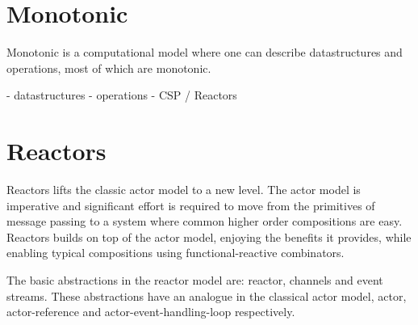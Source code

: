 \section{Monotonic}

Monotonic is a computational model where one can describe datastructures and operations, most of which are monotonic.

- datastructures
- operations
- CSP / Reactors


\section{Reactors}

Reactors lifts the classic actor model to a new level. The actor model is imperative and significant effort is required to move from the primitives of message passing to a system where common higher order compositions are easy. Reactors builds on top of the actor model, enjoying the benefits it provides, while enabling typical compositions using functional-reactive combinators.

The basic abstractions in the reactor model are: reactor, channels and event streams. These abstractions have an analogue in the classical actor model, actor, actor-reference and actor-event-handling-loop respectively.